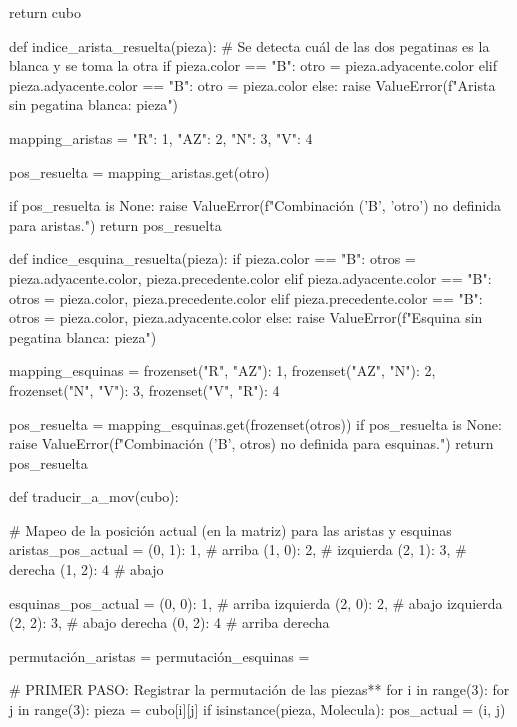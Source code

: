     return cubo


def indice_arista_resuelta(pieza):
    # Se detecta cuál de las dos pegatinas es la blanca y se toma la otra
    if pieza.color == "B":
        otro = pieza.adyacente.color
    elif pieza.adyacente.color == "B":
        otro = pieza.color
    else:
        raise ValueError(f"Arista sin pegatina blanca: {pieza}")
    
    mapping_aristas = {
        "R": 1,
        "AZ": 2,
        "N": 3,
        "V": 4
    }
    
    pos_resuelta = mapping_aristas.get(otro)
    
    if pos_resuelta is None:
        raise ValueError(f"Combinación ('B', '{otro}') no definida para aristas.")
    return pos_resuelta
    
def indice_esquina_resuelta(pieza):
    if pieza.color == "B":
        otros = {pieza.adyacente.color, pieza.precedente.color}
    elif pieza.adyacente.color == "B":
        otros = {pieza.color, pieza.precedente.color}
    elif pieza.precedente.color == "B":
        otros = {pieza.color, pieza.adyacente.color}
    else:
        raise ValueError(f"Esquina sin pegatina blanca: {pieza}")
    
    mapping_esquinas = {
        frozenset({"R", "AZ"}): 1,
        frozenset({"AZ", "N"}): 2,
        frozenset({"N", "V"}): 3,
        frozenset({"V", "R"}): 4
    }
    
    pos_resuelta = mapping_esquinas.get(frozenset(otros))
    if pos_resuelta is None:
        raise ValueError(f"Combinación ('B', {otros}) no definida para esquinas.")
    return pos_resuelta
        
def traducir_a_mov(cubo):
    
    # Mapeo de la posición actual (en la matriz) para las aristas y esquinas
    aristas_pos_actual = {
        (0, 1): 1,  # arriba
        (1, 0): 2,  # izquierda
        (2, 1): 3,  # derecha
        (1, 2): 4   # abajo
    }

    esquinas_pos_actual = {
        (0, 0): 1,  # arriba izquierda
        (2, 0): 2,  # abajo izquierda
        (2, 2): 3,  # abajo derecha
        (0, 2): 4   # arriba derecha
    }
    
    permutación_aristas = {}
    permutación_esquinas = {}

    # PRIMER PASO: Registrar la permutación de las piezas**  
    for i in range(3):
        for j in range(3):
            pieza = cubo[i][j]
            if isinstance(pieza, Molecula):
                pos_actual = (i, j)
                
